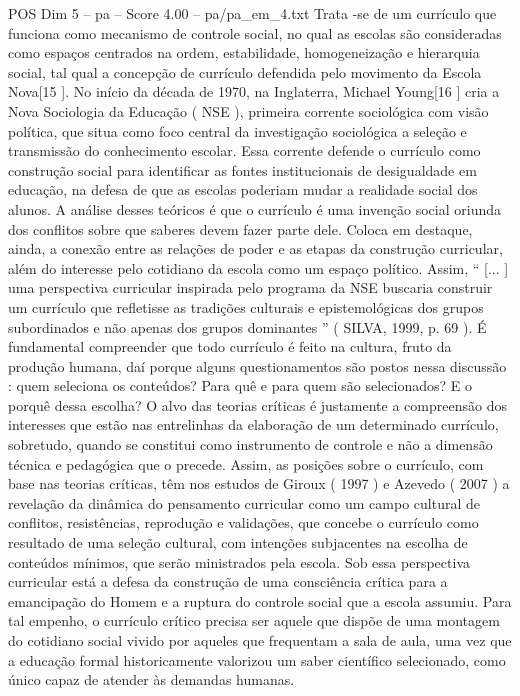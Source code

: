 \begin{textsample}{POS Dim 5 – pa – Score 4.00 – pa/pa\_em\_4.txt}
Trata -se de um currículo que funciona como mecanismo de controle social, no qual as escolas são consideradas como espaços centrados na ordem, estabilidade, homogeneização e hierarquia social, tal qual a concepção de currículo defendida pelo movimento da Escola Nova[15 ].
No início da década de 1970, na Inglaterra, Michael Young[16 ] cria a Nova Sociologia da Educação ( NSE ), primeira corrente sociológica com visão política, que situa como foco central da investigação sociológica a seleção e transmissão do conhecimento escolar.
Essa corrente defende o currículo como construção social para identificar as fontes institucionais de desigualdade em educação, na defesa de que as escolas poderiam mudar a realidade social dos alunos.
A análise desses teóricos é que o currículo é uma invenção social oriunda dos conflitos sobre que saberes devem fazer parte dele.
Coloca em destaque, ainda, a conexão entre as relações de poder e as etapas da construção curricular, além do interesse pelo cotidiano da escola como um espaço político.
Assim, “ [... ] uma perspectiva curricular inspirada pelo programa da NSE buscaria construir um currículo que refletisse as tradições culturais e epistemológicas dos grupos subordinados e não apenas dos grupos dominantes ” ( SILVA, 1999, p. 69 ).
É fundamental compreender que todo currículo é feito na cultura, fruto da produção humana, daí porque alguns questionamentos são postos nessa discussão : quem seleciona os conteúdos?
Para quê e para quem são selecionados?
E o porquê dessa escolha?
O alvo das teorias críticas é justamente a compreensão dos interesses que estão nas entrelinhas da elaboração de um determinado currículo, sobretudo, quando se constitui como instrumento de controle e não a dimensão técnica e pedagógica que o precede.
Assim, as posições sobre o currículo, com base nas teorias críticas, têm nos estudos de Giroux ( 1997 ) e Azevedo ( 2007 ) a revelação da dinâmica do pensamento curricular como um campo cultural de conflitos, resistências, reprodução e validações, que concebe o currículo como resultado de uma seleção cultural, com intenções subjacentes na escolha de conteúdos mínimos, que serão ministrados pela escola.
Sob essa perspectiva curricular está a defesa da construção de uma consciência crítica para a emancipação do Homem e a ruptura do controle social que a escola assumiu.
Para tal empenho, o currículo crítico precisa ser aquele que dispõe de uma montagem do cotidiano social vivido por aqueles que frequentam a sala de aula, uma vez que a educação formal historicamente valorizou um saber científico selecionado, como único capaz de atender às demandas humanas.

\end{textsample}
